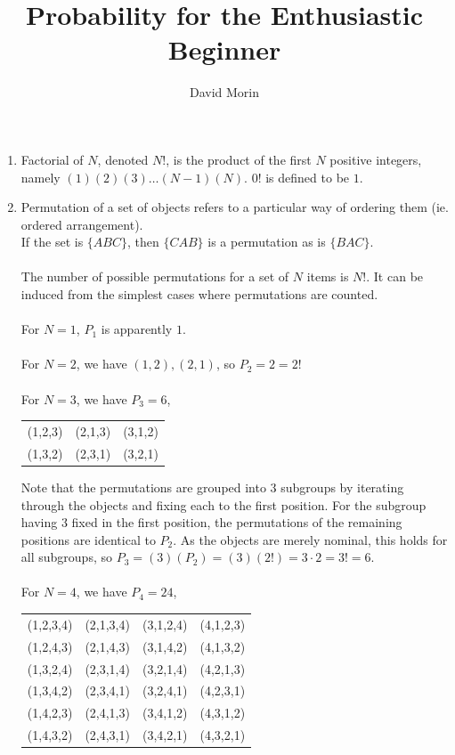 \documentclass[12pt]{article}
\title{Probability for the Enthusiastic Beginner}
\author{David Morin}
\date{}
\begin{document}
\maketitle

\begin{enumerate}

\item 
Factorial of $N$, denoted $N!$, is the product of the first $N$ positive integers, namely $(1)(2)(3)\dots(N-1)(N)$.
$0!$ is defined to be $1$. 

\item 
Permutation of a set of objects refers to a particular way of ordering them (ie. ordered arrangement). \\
If the set is $ \{ A B C \}$, then $ \{C A B \} $ is a permutation as is $ \{B A C\} $.
\\\\
The number of possible permutations for a set of $N$ items is $N!$. It can be induced from the simplest cases where permutations are counted.
\\\\
For $N=1$, $P_1$ is apparently $1$. 
\\\\
For $N=2$, we have $(1, 2), (2, 1)$, so $P_2 = 2 = 2!$
\\\\
For $N=3$, we have $P_3 = 6$,

{
\centering
\begin{tabular}{c c c}
    
    (1,2,3) & (2,1,3) & (3,1,2) \\
    (1,3,2) & (2,3,1) & (3,2,1)
    
\end{tabular} \par
}

Note that the permutations are grouped into 3 subgroups by iterating through the objects and fixing each to the first position. For the subgroup having 3 fixed in the first position, the permutations of the remaining positions are identical to $P_2$. As the objects are merely nominal,
this holds for all subgroups, so $P_3 = (3)(P_2) = (3)(2!) = 3 \cdot 2 = 3! = 6$.
\\\\
For $N=4$, we have $P_4 = 24$, 

{
\centering
\begin{tabular}{c c c c}
    
    (1,2,3,4) & (2,1,3,4) & (3,1,2,4) & (4,1,2,3) \\
    (1,2,4,3) & (2,1,4,3) & (3,1,4,2) & (4,1,3,2) \\
    (1,3,2,4) & (2,3,1,4) & (3,2,1,4) & (4,2,1,3) \\
    (1,3,4,2) & (2,3,4,1) & (3,2,4,1) & (4,2,3,1) \\ 
    (1,4,2,3) & (2,4,1,3) & (3,4,1,2) & (4,3,1,2) \\
    (1,4,3,2) & (2,4,3,1) & (3,4,2,1) & (4,3,2,1) 
    

\end{tabular}}
\end{enumerate}
\end{document}
